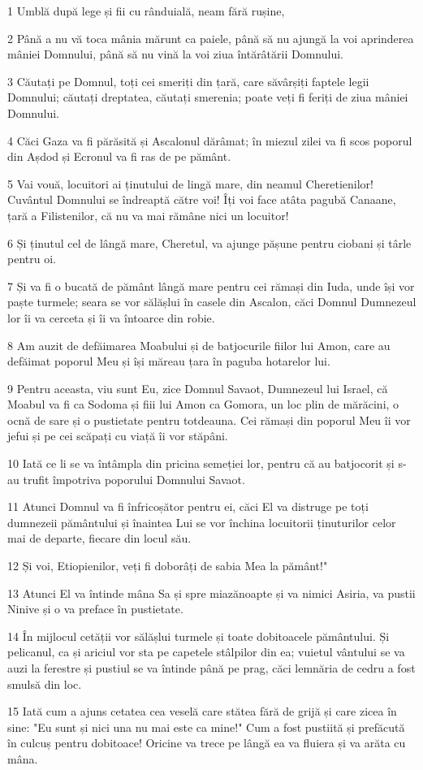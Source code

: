 \par 1 Umblă după lege și fii cu rânduială, neam fără rușine,
\par 2 Până a nu vă toca mânia mărunt ca paiele, până să nu ajungă la voi aprinderea mâniei Domnului, până să nu vină la voi ziua întărâtării Domnului.
\par 3 Căutați pe Domnul, toți cei smeriți din țară, care săvârșiți faptele legii Domnului; căutați dreptatea, căutați smerenia; poate veți fi feriți de ziua mâniei Domnului.
\par 4 Căci Gaza va fi părăsită și Ascalonul dărâmat; în miezul zilei va fi scos poporul din Așdod și Ecronul va fi ras de pe pământ.
\par 5 Vai vouă, locuitori ai ținutului de lingă mare, din neamul Cheretienilor! Cuvântul Domnului se îndreaptă către voi! Îți voi face atâta pagubă Canaane, țară a Filistenilor, că nu va mai rămâne nici un locuitor!
\par 6 Și ținutul cel de lângă mare, Cheretul, va ajunge pășune pentru ciobani și târle pentru oi.
\par 7 Și va fi o bucată de pământ lângă mare pentru cei rămași din Iuda, unde își vor paște turmele; seara se vor sălășlui în casele din Ascalon, căci Domnul Dumnezeul lor îi va cerceta și îi va întoarce din robie.
\par 8 Am auzit de defăimarea Moabului și de batjocurile fiilor lui Amon, care au defăimat poporul Meu și își măreau țara în paguba hotarelor lui.
\par 9 Pentru aceasta, viu sunt Eu, zice Domnul Savaot, Dumnezeul lui Israel, că Moabul va fi ca Sodoma și fiii lui Amon ca Gomora, un loc plin de mărăcini, o ocnă de sare și o pustietate pentru totdeauna. Cei rămași din poporul Meu îi vor jefui și pe cei scăpați cu viață îi vor stăpâni.
\par 10 Iată ce li se va întâmpla din pricina semeției lor, pentru că au batjocorit și s-au trufit împotriva poporului Domnului Savaot.
\par 11 Atunci Domnul va fi înfricoșător pentru ei, căci El va distruge pe toți dumnezeii pământului și înaintea Lui se vor închina locuitorii ținuturilor celor mai de departe, fiecare din locul său.
\par 12 Și voi, Etiopienilor, veți fi doborâți de sabia Mea la pământ!"
\par 13 Atunci El va întinde mâna Sa și spre miazănoapte și va nimici Asiria, va pustii Ninive și o va preface în pustietate.
\par 14 În mijlocul cetății vor sălășlui turmele și toate dobitoacele pământului. Și pelicanul, ca și ariciul vor sta pe capetele stâlpilor din ea; vuietul vântului se va auzi la ferestre și pustiul se va întinde până pe prag, căci lemnăria de cedru a fost smulsă din loc.
\par 15 Iată cum a ajuns cetatea cea veselă care stătea fără de grijă și care zicea în sine: "Eu sunt și nici una nu mai este ca mine!" Cum a fost pustiită și prefăcută în culcuș pentru dobitoace! Oricine va trece pe lângă ea va fluiera și va arăta cu mâna.


